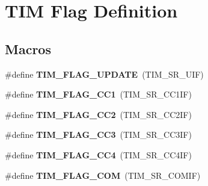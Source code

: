 \hypertarget{group___t_i_m___flag__definition}{}\section{T\+IM Flag Definition}
\label{group___t_i_m___flag__definition}
\subsection*{Macros}
\begin{DoxyCompactItemize}
\item 
\mbox{\label{group___t_i_m___flag__definition_gac45ce66cf33b4f324323fc3036917712}} 
\#define {\bfseries T\+I\+M\+\_\+\+F\+L\+A\+G\+\_\+\+U\+P\+D\+A\+TE}~(T\+I\+M\+\_\+\+S\+R\+\_\+\+U\+IF)
\item 
\mbox{\label{group___t_i_m___flag__definition_gaa7eb8be054b9bd217a9abb1c8687cc55}} 
\#define {\bfseries T\+I\+M\+\_\+\+F\+L\+A\+G\+\_\+\+C\+C1}~(T\+I\+M\+\_\+\+S\+R\+\_\+\+C\+C1\+IF)
\item 
\mbox{\label{group___t_i_m___flag__definition_ga9cae242f1c51b31839ffc5bc007c82a7}} 
\#define {\bfseries T\+I\+M\+\_\+\+F\+L\+A\+G\+\_\+\+C\+C2}~(T\+I\+M\+\_\+\+S\+R\+\_\+\+C\+C2\+IF)
\item 
\mbox{\label{group___t_i_m___flag__definition_ga052c380f922219659810e4fceb574a7c}} 
\#define {\bfseries T\+I\+M\+\_\+\+F\+L\+A\+G\+\_\+\+C\+C3}~(T\+I\+M\+\_\+\+S\+R\+\_\+\+C\+C3\+IF)
\item 
\mbox{\label{group___t_i_m___flag__definition_gafd0dc57b56941f8b8250d66e289542db}} 
\#define {\bfseries T\+I\+M\+\_\+\+F\+L\+A\+G\+\_\+\+C\+C4}~(T\+I\+M\+\_\+\+S\+R\+\_\+\+C\+C4\+IF)
\item 
\mbox{\label{group___t_i_m___flag__definition_gad454d70205ce5bbf3b3c0e7e43d6df62}} 
\#define {\bfseries T\+I\+M\+\_\+\+F\+L\+A\+G\+\_\+\+C\+OM}~(T\+I\+M\+\_\+\+S\+R\+\_\+\+C\+O\+M\+IF)
\item 
\mbox{\label{group___t_i_m___flag__definition_gacacf94fcf8b5ee4287f2d5a56dce91b7}} 

\end{DoxyCompactItemize}
